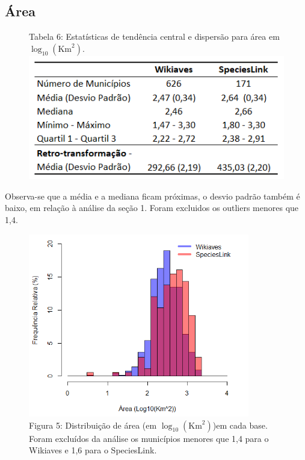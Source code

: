 \documentclass[12pt]{extarticle}
\newenvironment{resposta}{ \color{mygray}}{}
\begin{document}
\newpage

\subsection{Área}

\begin{figure}[h!]
\centering
{\scriptsize Tabela 6: Estatísticas de tendência central e dispersão para área em $\log_{10}(\text{Km}^2)$.}
\includegraphics{Imagens/T06.png}
\end{figure}

\begin{resposta}
Observa-se que a média e a mediana ficam próximas, o desvio padrão também é baixo, em relação à análise da seção 1. Foram excluidos os outliers menores que 1,4.
\end{resposta}



\begin{figure}[h!]
\centering
\includegraphics[height = 8cm]{Imagens/H05.png}
\\{\scriptsize Figura 5: Distribuição de área (em $\log_{10}(\text{Km}^2)$)em cada base. Foram excluídos da análise os municípios menores que 1,4 para o Wikiaves e 1,6 para o SpeciesLink. }
\end{figure}
\end{document}

